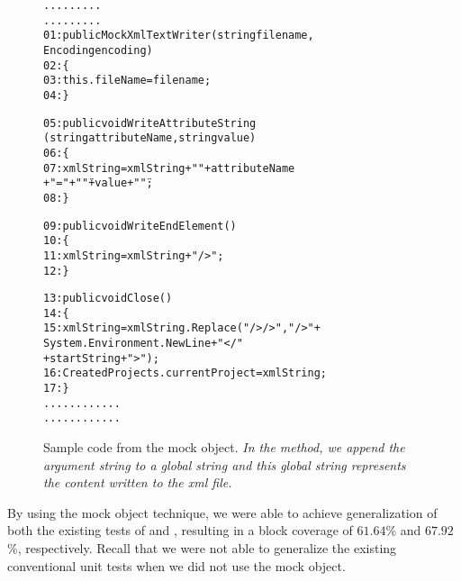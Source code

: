 \begin{figure}
\begin{CodeOut}
\begin{alltt}
.........
.........
01:\hspace*{0.1in}public MockXmlTextWriter(string filename,
\hspace*{0.3in} Encoding encoding)
02:\hspace*{0.1in}\{
03:\hspace*{0.3in}this.fileName = filename;
04:\hspace*{0.1in}\}

05:\hspace*{0.1in}public void WriteAttributeString
\hspace*{0.3in}(string attributeName, string value)
06:\hspace*{0.1in}\{
07:\hspace*{0.3in}xmlString = xmlString + " " + attributeName 
\hspace*{0.7in}+ "=" + "\"" + value + "\"";
08:\hspace*{0.1in}\}

09:\hspace*{0.1in}public void WriteEndElement()
10:\hspace*{0.1in}\{
11:\hspace*{0.3in}xmlString = xmlString + " />";
12:\hspace*{0.1in}\}

13:\hspace*{0.1in}public void Close()
14:\hspace*{0.1in}\{
15:\hspace*{0.3in}xmlString = xmlString.Replace("/> />", "/>" + 
   \hspace*{0.5in}System.Environment.NewLine + "</" 
   \hspace*{0.7in}+ startString + ">");
16:\hspace*{0.3in}CreatedProjects.currentProject = xmlString;
17:\hspace*{0.1in}\}
............
............
\end{alltt}
\end{CodeOut}
\caption{\label{fig:mockobject} Sample code from the  mock object. \textit{In the  method, we append the argument string to a global string  and this global string represents the content written to the xml file.}}
\end{figure}

By using the mock object technique, we were able to achieve generalization of both the existing tests of  and , resulting in a block coverage of $61.64$\% and $67.92$\%, respectively. Recall that we were not able to generalize the existing conventional unit tests when we did not use the mock object. 

